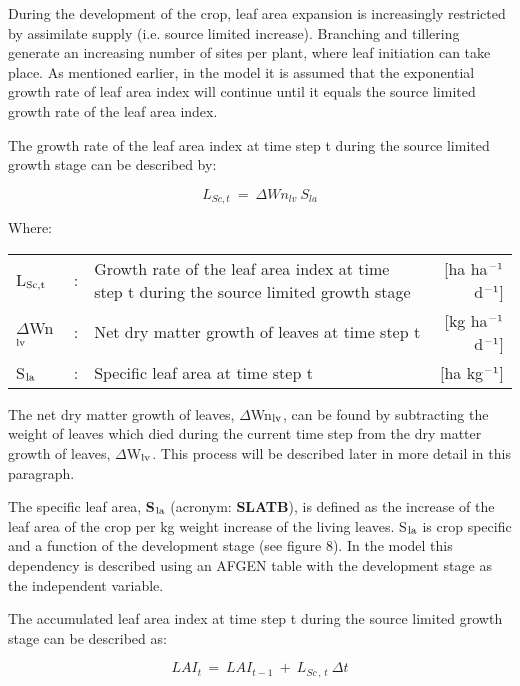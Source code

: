 During the development of the crop, leaf area expansion is increasingly restricted by assimilate supply (i.e. source limited increase). Branching and tillering generate an increasing number of sites per plant, where leaf initiation can take place. As mentioned earlier, in the model it is assumed that the exponential growth rate of leaf area index will continue until it equals the source limited growth rate of the leaf area index.

The growth rate of the leaf area index at time step t during the source limited growth stage can be described by:

\begin{equation}
\label{eq:5.52}
L _{Sc,t} ~=~\Delta Wn _{lv} ~S _{la} 
\end{equation}

Where:\\[5pt]
\begin{tabularx}{\textwidth}{llXr}
	L$_{{\rm Sc,t}}$ &:& Growth rate of the leaf area index at time step t
	during the source limited growth stage    &
	[ha ha$^{{\rm -1}}$ d$^{{\rm -1}}$]\\
	$\Delta$Wn$_{{\rm lv}}$ &:& Net dry matter growth of leaves at time step t    &
	[kg ha$^{{\rm -1}}$ d$^{{\rm -1}}$]\\
	S$_{{\rm la}}$ &:& Specific leaf area at time step t   &
	[ha kg$^{{\rm -1}}$]\\
\end{tabularx}

The net dry matter growth of leaves, $\Delta$Wn$_{{\rm lv}}$, can be found by subtracting the weight of leaves which died during the current time step from the dry matter growth of leaves, $\Delta$W$_{{\rm lv}}$. This process will be described later in more detail in this paragraph.

The specific leaf area, {\bf S$_{{\rm la}}$} (acronym: {\bf SLATB}), is defined as the increase of the leaf area of the crop per kg weight increase of the living leaves. S$_{{\rm la}}$ is crop specific and a function of the development stage (see figure 8). In the model this dependency is described using an AFGEN table with the development stage as the independent variable.

The accumulated leaf area index at time step t during the source limited growth stage can be described as:

\begin{equation}
\label{eq:5.53}
LAI _{t~} =~LAI _{t-1} ~+~L _{Sc\, ,\, t} ~\Delta t
\end{equation}

